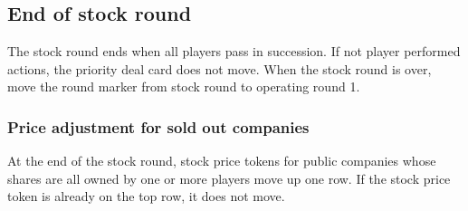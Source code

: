 \documentclass{article}
\begin{document}
\begin{CJK}{UTF8}{min}
\subsection{End of stock round}
The stock round ends when all players pass in succession. If not
player performed actions, the priority deal card does not move. When
the stock round is over, move the round marker from stock round to
operating round 1.

\subsubsection{Price adjustment for sold out companies}
At the end of the stock round, stock price tokens for public companies
whose shares are all owned by one or more players move up one
row. If the stock price token is already on the top row, it does not move.















\end{CJK}
\end{document}
